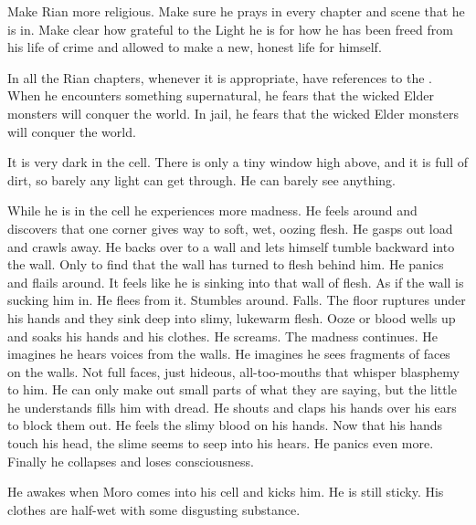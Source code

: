 Make Rian more religious.
Make sure he prays in every chapter and scene that he is in.
Make clear how grateful to the Light he is for how he has been freed from his life of crime and allowed to make a new, honest life for himself.
    
In all the Rian chapters, whenever it is appropriate, have references to the . 
When he encounters something supernatural, he fears that the wicked Elder monsters will conquer the world. 
In jail, he fears that the wicked Elder monsters will conquer the world. 

It is very dark in the cell.
There is only a tiny window high above, and it is full of dirt, so barely any light can get through.
He can barely see anything. 

While he is in the cell he experiences more madness. 
He feels around and discovers that one corner gives way to soft, wet, oozing flesh. 
He gasps out load and crawls away. 
He backs over to a wall and lets himself tumble backward into the wall.
Only to find that the wall has turned to flesh behind him. 
He panics and flails around.
It feels like he is sinking into that wall of flesh.
As if the wall is sucking him in. 
He flees from it. 
Stumbles around. 
Falls. 
The floor ruptures under his hands and they sink deep into slimy, lukewarm flesh.
Ooze or blood wells up and soaks his hands and his clothes. 
He screams. 
The madness continues.
He imagines he hears voices from the walls. 
He imagines he sees fragments of faces on the walls.
Not full faces, just hideous, all-too-\human mouths that whisper blasphemy to him. 
He can only make out small parts of what they are saying, but the little he understands fills him with dread. 
He shouts and claps his hands over his ears to block them out.
He feels the slimy blood on his hands. 
Now that his hands touch his head, the slime seems to seep into his hears. 
He panics even more. 
Finally he collapses and loses consciousness.




\begin{comment}
  \section{Moro rescues Rian}
\end{comment}
He awakes when Moro comes into his cell and kicks him.
He is still sticky.
His clothes are half-wet with some disgusting substance. 

